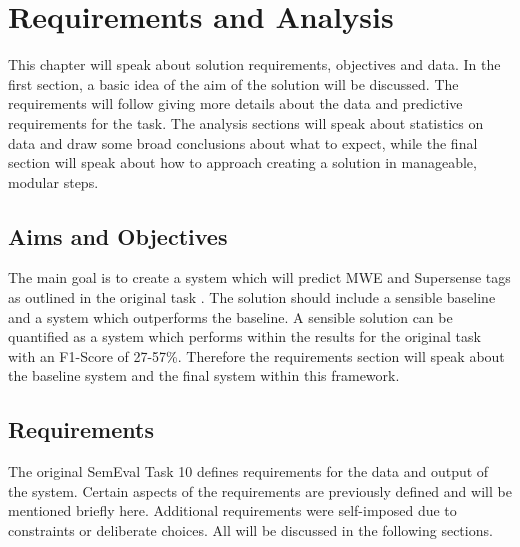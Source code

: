 \chapter{Requirements and Analysis}\label{chapter3}

This chapter will speak about solution requirements, objectives and data. In the first section, a basic idea of the aim of the solution will be discussed. The requirements will follow giving more details about the data and predictive requirements for the task. The analysis sections will speak about statistics on data and draw some broad  conclusions about what to expect, while the final section will speak about how to approach creating a solution in manageable, modular steps.

\section{Aims and Objectives}

The main goal is to create a system which will predict MWE and Supersense tags as outlined in the original \dimsum task \cite{Schneider2016}. The solution should include a sensible baseline and a system which outperforms the baseline. A sensible solution can be quantified as a system which performs within the results for the original task with an F1-Score of 27-57\%. Therefore the requirements section will speak about the baseline system and the final system within this framework. 

\section{Requirements}

The original SemEval Task 10 \dimsum defines requirements for the data and output of the system. Certain aspects of the requirements are previously defined and will be mentioned briefly here. Additional requirements were self-imposed due to constraints or deliberate choices. All will be discussed in the following sections.

